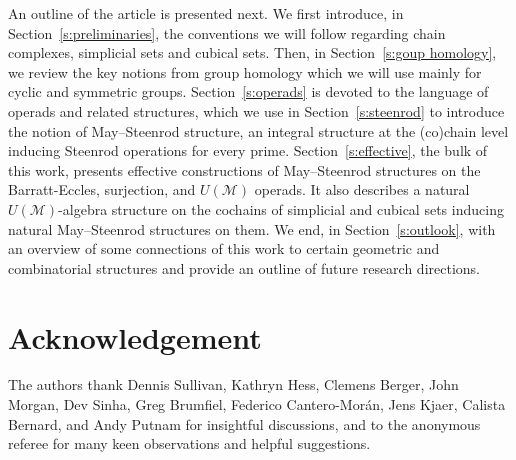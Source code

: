 An outline of the article is presented next.
We first introduce, in Section~\ref{s:preliminaries}, the conventions we will follow regarding chain complexes, simplicial sets and cubical sets.
Then, in Section~\ref{s:goup homology}, we review the key notions from group homology which we will use mainly for cyclic and symmetric groups.
Section~\ref{s:operads} is devoted to the language of operads and related structures, which we use in Section~\ref{s:steenrod} to introduce the notion of May--Steenrod structure, an integral structure at the (co)chain level inducing Steenrod operations for every prime.
Section~\ref{s:effective}, the bulk of this work, presents effective constructions of May--Steenrod structures on the Barratt-Eccles, surjection, and $U(\mathcal M)$ operads.
It also describes a natural $U(\mathcal M)$-algebra structure on the cochains of simplicial and cubical sets inducing natural May--Steenrod structures on them.
We end, in Section~\ref{s:outlook}, with an overview of some connections of this work to certain geometric and combinatorial structures and provide an outline of future research directions.

\section*{Acknowledgement}

The authors thank Dennis Sullivan, Kathryn Hess, Clemens Berger, John Morgan, Dev Sinha, Greg Brumfiel, Federico Cantero-Mor\'an, Jens Kjaer, Calista Bernard, and Andy Putnam for insightful discussions, and to the anonymous referee for many keen observations and helpful suggestions.
